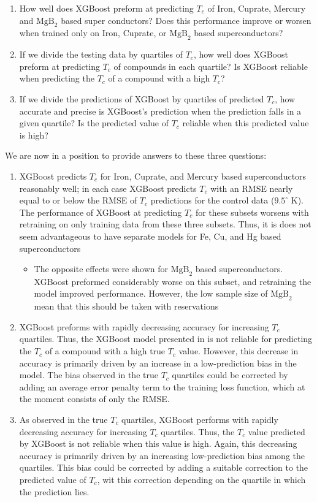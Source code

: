 \documentclass[oneside,12pt]{amsart}
\begin{document}
 \begin{enumerate}
     \item How well does XGBoost preform at predicting $T_c$ of Iron, Cuprate, Mercury and $\text{MgB}_2$ based super conductors? Does this performance improve or worsen when trained only on Iron, Cuprate, or $\text{MgB}_2$ based superconductors?
     \item If we divide the testing data by quartiles of $T_c$, how well does XGBoost preform at predicting $T_c$ of compounds in each quartile? Is XGBoost reliable when predicting the $T_c$ of a compound with a high $T_c$?
     \item If we divide the predictions of XGBoost by quartiles of predicted $T_c$, how accurate and precise is XGBoost's prediction when the prediction falls in a given quartile? Is the predicted value of $T_c$ reliable when this predicted value is high?
 \end{enumerate}
 We are now in a position to provide answers to these three questions:
 \begin{enumerate}
     \item XGBoost predicts $T_c$ for Iron, Cuprate, and Mercury based superconductors reasonably well; in each case XGBoost predicts $T_c$ with an RMSE nearly equal to or below the RMSE of $T_c$ predictions for the control data ($9.5^\circ$ K). The performance of XGBoost at predicting $T_c$ for these subsets worsens with retraining on only training data from these three subsets. Thus, it is does not seem advantageous to have separate models for Fe, Cu, and Hg based superconductors
     \begin{itemize}
         \item The opposite effects were shown for $\text{MgB}_2$ based superconductors. XGBoost preformed considerably worse on this subset, and retraining the model improved performance. However, the low sample size of $\text{MgB}_2$ mean that this should be taken with reservations
     \end{itemize}
     \item XGBoost preforms with rapidly decreasing accuracy for increasing $T_c$ quartiles. Thus, the XGBoost model presented in \cite{hamidieh_data-driven_2018} is not reliable for predicting the $T_c$ of a compound with a high true $T_c$ value. However, this decrease in accuracy is primarily driven by an increase in a low-prediction bias in the model. The bias observed in the true $T_c$ quartiles could be corrected by adding an average error penalty term to the training loss function, which at the moment consists of only the RMSE.
     \item As observed in the true $T_c$ quartiles, XGBoost performs with rapidly decreasing accuracy for increasing $T_c$ quartiles. Thus, the $T_c$ value predicted by XGBoost is not reliable when this value is high. Again, this decreasing accuracy is primarily driven by an increasing low-prediction bias among the quartiles. This bias could be corrected by adding a suitable correction to the predicted value of $T_c$, wit this correction depending on the quartile in which the prediction lies.
 \end{enumerate}
 
\end{document}
